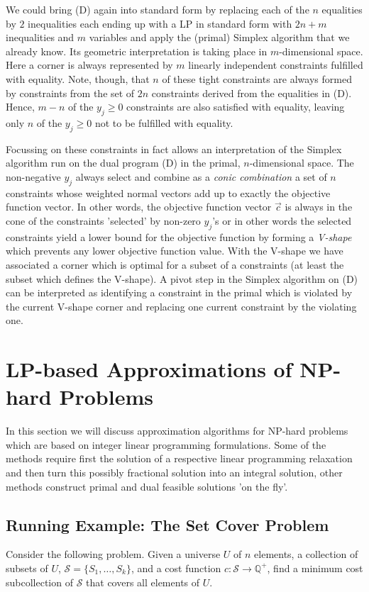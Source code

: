 \documentclass{article}
\begin{document}
We could bring (D) again into standard form  by replacing each of the $n$ equalities by $2$ inequalities each ending up with a LP in standard form with  $2n+m$ inequalities and $m$ variables and apply the (primal) Simplex algorithm that we already know. Its geometric interpretation is taking place in $m$-dimensional space. Here a corner is always represented by $m$ linearly independent constraints fulfilled with equality. Note, though, that $n$ of these tight constraints are always formed by constraints from the set of $2n$ constraints derived from the equalities in (D). Hence, $m-n$ of the $y_j\geq 0$ constraints are also satisfied with equality, leaving only $n$ of the $y_j\geq 0$ not to be fulfilled with equality.

Focussing on these constraints in fact allows an interpretation of the Simplex algorithm run on the dual program (D) in the primal, $n$-dimensional space. The non-negative $y_j$ always select and combine as a \emph{conic combination} a set of $n$ constraints whose weighted normal vectors add up to exactly the objective function vector. In other words, the objective function vector $\overrightarrow{c}$ is always in the cone of the constraints 'selected' by non-zero $y_j$'s or in other words the selected constraints yield a lower bound for the objective function by forming a \emph{V-shape} which prevents any lower objective function value. 
With the V-shape we have associated a corner which is optimal for a subset of a constraints (at least the subset which defines the V-shape). A pivot step in the Simplex algorithm on (D) can be interpreted as identifying a constraint in the primal which is violated by the current V-shape corner and replacing one current constraint by the violating one.


\newpage

\section{LP-based Approximations of NP-hard Problems}
In this section we will discuss approximation algorithms for NP-hard problems which are based on integer linear programming formulations. Some of the methods require first the solution of a respective linear programming relaxation and then turn this possibly fractional solution into an integral solution, other methods construct primal and dual feasible solutions 'on the fly'.
 
\subsection{Running Example: The Set Cover Problem}
Consider the following problem. Given a universe $U$ of $n$ elements, a collection of subsets of $U$,
$\mathcal{S}=\{S_1, \dots, S_k\}$, and a cost function $c: \mathcal{S} \rightarrow \mathbb{Q}^+$, find a minimum cost
subcollection of $\mathcal{S}$ that covers all elements of $U$.
\end{document}

